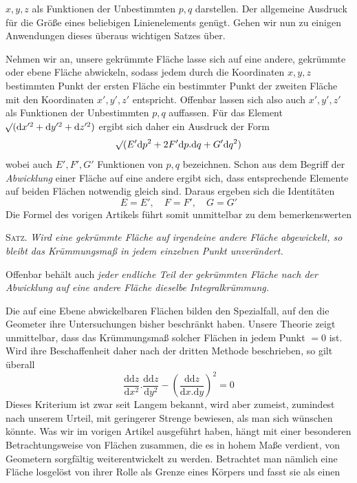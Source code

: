 %
 \(x,y,z\) als Funktionen der Unbestimmten \(p,q\) darstellen. Der allgemeine Ausdruck für die Größe eines beliebigen Linienelements genügt. Gehen wir nun zu einigen Anwendungen dieses überaus wichtigen Satzes über.

Nehmen wir an, unsere gekrümmte Fläche lasse sich auf eine andere, gekrümmte oder ebene Fläche abwickeln, sodass jedem durch die Koordinaten \(x,y,z\) bestimmten Punkt der ersten Fläche ein bestimmter Punkt der zweiten Fläche mit den Koordinaten \(x',y',z'\) entspricht. Offenbar lassen sich also auch \(x',y',z'\) als Funktionen der Unbestimmten \(p,q\) auffassen. Für das Element \(\mathord{{}^{}\!\surd}(\mathrm{d}x'^2+\mathrm{d}y'^2+\mathrm{d}z'^2)\) ergibt sich daher ein Ausdruck der Form
\[
\mathord{{}^{}\!\surd}(E'\mathrm{d}p^2+2F'\mathrm{d}p\mathord{.}\mathrm{d}q+G'\mathrm{d}q^2)
\]
wobei auch \(E',F',G'\) Funktionen von \(p,q\) bezeichnen. Schon aus dem Begriff der \textit{Abwicklung} einer Fläche auf eine andere ergibt sich, dass entsprechende Elemente auf beiden Flächen notwendig gleich sind. Daraus ergeben sich die Identitäten
\[
E=E',\quad F=F',\quad G=G'
\]
Die Formel des vorigen Artikels führt somit unmittelbar zu dem bemerkenswerten

\textsc{Satz.} \textit{Wird eine gekrümmte Fläche auf irgendeine andere Fläche abgewickelt, so bleibt das Krümmungsmaß in jedem einzelnen Punkt unverändert.}

Offenbar behält auch \textit{jeder endliche Teil der gekrümmten Fläche nach der Abwicklung auf eine andere Fläche dieselbe Integralkrümmung.}

Die auf eine Ebene abwickelbaren Flächen bilden den Spezialfall, auf den die Geometer ihre Untersuchungen bisher beschränkt haben. Unsere Theorie zeigt unmittelbar, dass das Krümmungsmaß solcher Flächen in jedem Punkt \(=0\) ist. Wird ihre Beschaffenheit daher nach der dritten Methode beschrieben, so gilt überall
\[
\frac{\mathrm{d}\mathrm{d}z}{\mathrm{d}x^2}\mathord{.}\frac{\mathrm{d}\mathrm{d}z}{\mathrm{d}y^2}-(\frac{\mathrm{d}\mathrm{d}z}{\mathrm{d}x\mathord{.}\mathrm{d}y})^2=0
\]
Dieses Kriterium ist zwar seit Langem bekannt, wird aber zumeist, zumindest nach unserem Urteil, mit geringerer Strenge bewiesen, als man sich wünschen könnte.
Was wir im vorigen Artikel ausgeführt haben, hängt mit einer besonderen Betrachtungsweise von Flächen zusammen, die es in hohem Maße verdient, von Geometern sorgfältig weiterentwickelt zu werden. Betrachtet man nämlich eine Fläche losgelöst von ihrer Rolle als Grenze eines Körpers und fasst sie als einen
